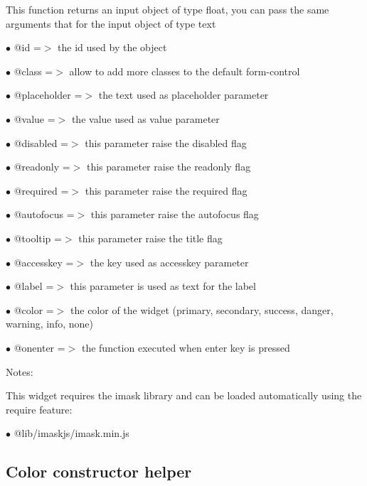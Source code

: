 \documentclass[a4paper]{book}
\begin{document}
This function returns an input object of type float, you can pass the same arguments
that for the input object of type text

\begin{compactitem}
\item[\color{myblue}$\bullet$] @id          =$>$ the id used by the object
\item[\color{myblue}$\bullet$] @class       =$>$ allow to add more classes to the default form-control
\item[\color{myblue}$\bullet$] @placeholder =$>$ the text used as placeholder parameter
\item[\color{myblue}$\bullet$] @value       =$>$ the value used as value parameter
\item[\color{myblue}$\bullet$] @disabled    =$>$ this parameter raise the disabled flag
\item[\color{myblue}$\bullet$] @readonly    =$>$ this parameter raise the readonly flag
\item[\color{myblue}$\bullet$] @required    =$>$ this parameter raise the required flag
\item[\color{myblue}$\bullet$] @autofocus   =$>$ this parameter raise the autofocus flag
\item[\color{myblue}$\bullet$] @tooltip     =$>$ this parameter raise the title flag
\item[\color{myblue}$\bullet$] @accesskey   =$>$ the key used as accesskey parameter
\item[\color{myblue}$\bullet$] @label       =$>$ this parameter is used as text for the label
\item[\color{myblue}$\bullet$] @color       =$>$ the color of the widget (primary, secondary, success, danger, warning, info, none)
\item[\color{myblue}$\bullet$] @onenter     =$>$ the function executed when enter key is pressed
\end{compactitem}

Notes:

This widget requires the imask library and can be loaded automatically using the require
feature:

\begin{compactitem}
\item[\color{myblue}$\bullet$] @lib/imaskjs/imask.min.js
\end{compactitem}

\hypertarget{toc464}{}
\subsection{Color constructor helper}
\end{document}
